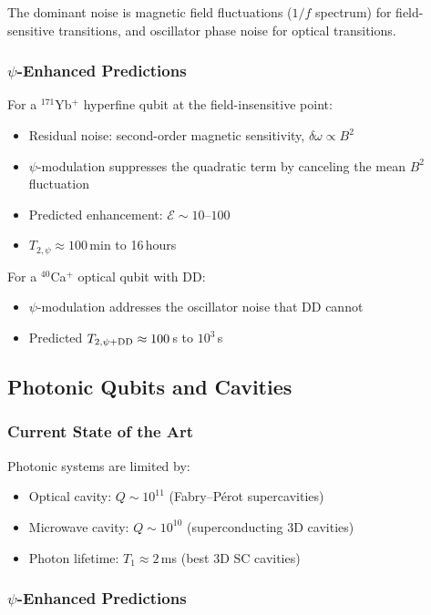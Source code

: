 \documentclass[aps,prd,twocolumn,superscriptaddress,nofootinbib]{revtex4-2}
\begin{document}
The dominant noise is magnetic field fluctuations ($1/f$ spectrum) for
field-sensitive transitions, and oscillator phase noise for optical
transitions.

\subsubsection{$\psi$-Enhanced Predictions}

For a $^{171}$Yb$^+$ hyperfine qubit at the field-insensitive point:
\begin{itemize}
\item Residual noise: second-order magnetic sensitivity,
$\delta\omega \propto B^2$
\item $\psi$-modulation suppresses the quadratic term by canceling the
mean $B^2$ fluctuation
\item Predicted enhancement: $\mathcal{E} \sim 10$--$100$
\item $T_{2,\psi} \approx 100$\,min to 16\,hours
\end{itemize}

For a $^{40}$Ca$^+$ optical qubit with DD:
\begin{itemize}
\item $\psi$-modulation addresses the oscillator noise that DD cannot
\item Predicted $T_{2,\psi+\rm DD} \approx 100$\,s to $10^3$\,s
\end{itemize}

\subsection{Photonic Qubits and Cavities}

\subsubsection{Current State of the Art}

Photonic systems are limited by:
\begin{itemize}
\item Optical cavity: $Q \sim 10^{11}$ (Fabry--P\'erot supercavities)
\item Microwave cavity: $Q \sim 10^{10}$ (superconducting 3D cavities)
\item Photon lifetime: $T_1 \approx 2$\,ms (best 3D SC cavities)
\end{itemize}

\subsubsection{$\psi$-Enhanced Predictions}
\end{document}

